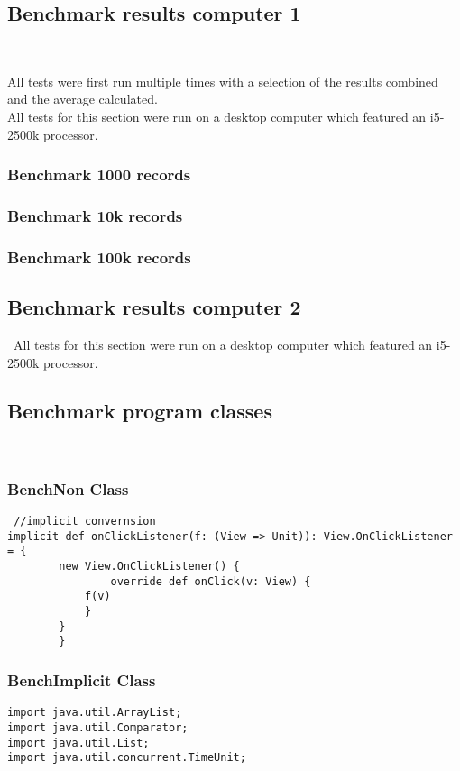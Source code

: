 \documentclass[11pt]{article}  %
\theoremstyle{definition}
\theoremstyle{remark}
\begin{document}
\newpage
\begin{appendices}

\subsection{Benchmark results computer 1}\

All tests were first run multiple times with a selection of the results combined and
the average calculated.\\

All tests for this section were run on a desktop computer which featured an i5-2500k processor.\\

\subsubsection{Benchmark 1000 records}\label{2} 


\subsubsection{Benchmark 10k records}\label{2} 

\subsubsection{Benchmark 100k records}\label{2} 


\newpage
\subsection{Benchmark results computer 2}\
All tests for this section were run on a desktop computer which featured an i5-2500k processor.\\
\newpage
\subsection{Benchmark program classes}\

 
\subsubsection{BenchNon Class}\label{1} 
  \begin{lstlisting}
 //implicit convernsion
implicit def onClickListener(f: (View => Unit)): View.OnClickListener = {
		new View.OnClickListener() {
				override def onClick(v: View) {
			f(v)
			}
		}
		}
\end{lstlisting}
\newpage
\subsubsection{BenchImplicit Class}\label{3} 
 \begin{lstlisting}
import java.util.ArrayList;
import java.util.Comparator;
import java.util.List;
import java.util.concurrent.TimeUnit;


\end{lstlisting}
\end{appendices}
\end{document}
